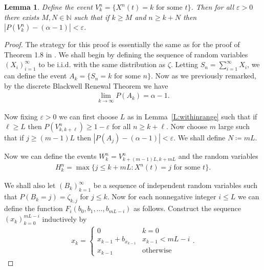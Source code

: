 \documentclass[11pt]{article}
\newtheorem{lemma}{Lemma}
\theoremstyle{definition}
\newcommand{\N}{\mathbb{N}}
\newcommand{\lemref}[1]{Lemma~\ref{L:#1}}
\begin{document}
\begin{lemma}\label{L:probhitfromfar}
        Define the event $V_{k}^n = \{X^n(t) = k \text{ for some $t$}\}$. Then for all $\varepsilon > 0$ there exists $M,N \in \N$ such that if $k \geq M$ and $n \geq k + N$ then $|P(V^n_k) - (\alpha - 1)| < \varepsilon$.
\end{lemma}

\begin{proof}
    The strategy for this proof is essentially the same as for the proof of Theorem 1.8 in \cite{betasmalltime}. We shall begin by defining the sequence of random variables $(X_i)_{i = 1}^\infty$ to be i.i.d. with the same distribution as $\zeta$. Letting $S_n = \sum_{i = 1}^\infty X_i$, we can define the event $A_k = \{S_n = k \text{ for some $n$}\}$. Now as we previously remarked, by the discrete Blackwell Renewal Theorem we have
    \begin{align*}
        \lim_{k \to \infty} P(A_k) = \alpha -1.
    \end{align*}

    \noindent Now fixing $\varepsilon > 0$ we can first choose $L$ as in \lemref{withinrange} such that if $\ell \geq L$ then $P(V_{k,k+\ell}^n) \geq 1-\varepsilon$ for all $n \geq k + \ell$. Now choose $m$ large such that if $j \geq (m-1)L$ then $|P(A_j) - (\alpha - 1)| < \varepsilon$. We shall define $N \coloneqq mL$. 
    \medskip
    
    \noindent Now we can define the events $W_k^n = V^n_{k + (m-1)L, k + mL}$ and the random variables
    \begin{align*}
        H_k^n = \max\{j \leq k + mL \colon X^n(t) = j \text{ for some $t$}\}.
    \end{align*}
    
    
    \noindent We shall also let $(B_k)_{k = 1}^\infty$ be a sequence of independent random variables such that $P(B_k = j) = \zeta_{k,j}$ for $j \leq k$. Now for each nonnegative integer $i \leq L$ we can define the function $F_i(b_0, b_1, \ldots, b_{mL - i})$ as follows. Construct the sequence $(x_k)_{k = 0}^{mL-i}$ inductively by
    \begin{align*}
        x_k = \begin{cases}
            0 &  k= 0\\
            x_{k-1} + b_{x_{k-1}} & x_{k-1} < mL- i\\
            x_{k-1} & \text{otherwise}
        \end{cases}.
    \end{align*}


\end{proof}
\end{document}
